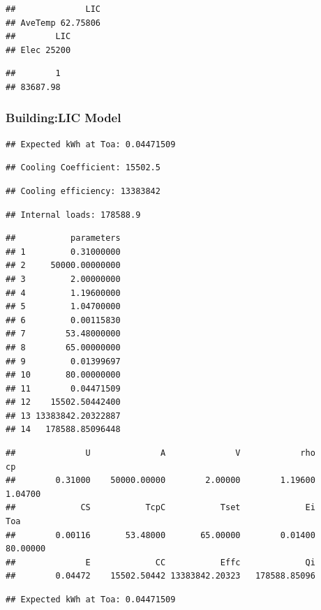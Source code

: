 \documentclass[]{article}
\begin{document}
\begin{verbatim}
##              LIC
## AveTemp 62.75806
##        LIC
## Elec 25200
\end{verbatim}

\begin{verbatim}
##        1 
## 83687.98
\end{verbatim}

\subsubsection{Building:LIC Model}\label{buildinglic-model}

\begin{verbatim}
## Expected kWh at Toa: 0.04471509
\end{verbatim}

\begin{verbatim}
## Cooling Coefficient: 15502.5
\end{verbatim}

\begin{verbatim}
## Cooling efficiency: 13383842
\end{verbatim}

\begin{verbatim}
## Internal loads: 178588.9
\end{verbatim}

\begin{verbatim}
##           parameters
## 1         0.31000000
## 2     50000.00000000
## 3         2.00000000
## 4         1.19600000
## 5         1.04700000
## 6         0.00115830
## 7        53.48000000
## 8        65.00000000
## 9         0.01399697
## 10       80.00000000
## 11        0.04471509
## 12    15502.50442400
## 13 13383842.20322887
## 14   178588.85096448
\end{verbatim}

\begin{verbatim}
##              U              A              V            rho             cp 
##        0.31000    50000.00000        2.00000        1.19600        1.04700 
##             CS           TcpC           Tset             Ei            Toa 
##        0.00116       53.48000       65.00000        0.01400       80.00000 
##              E             CC           Effc             Qi 
##        0.04472    15502.50442 13383842.20323   178588.85096
\end{verbatim}

\begin{verbatim}
## Expected kWh at Toa: 0.04471509
\end{verbatim}
\end{document}
